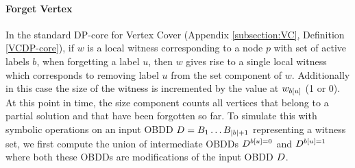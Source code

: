 
\paragraph*{Forget Vertex}

In the standard DP-core for {\sc Vertex Cover} (Appendix \ref{subsection:VC}, Definition \ref{VCDP-core}), if $w$ is a local witness corresponding to a node $p$ with set of active labels $b$, when forgetting a label $u$, then $w$ gives rise to a single local witness which corresponds to removing label $u$ from the set component of $w$. Additionally in this case the size of the witness is incremented by the value at $w_{b[u]}$ (1 or 0). At this point in time, the size component counts all vertices that belong to a partial solution and that have been forgotten so far. To simulate this with symbolic operations on an input OBDD $D = B_1\ldots B_{|b|+1}$ representing a witness set, we first compute the union of intermediate OBDDs $D^{b[u]=0} $ and $D^{b[u]=1}$ where both these OBDDs are modifications of the input OBDD $D$.


